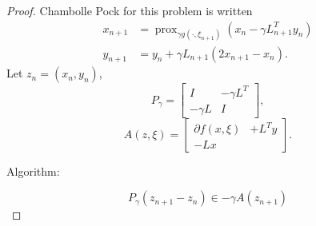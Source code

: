 \documentclass{article}
\DeclareMathOperator{\prox}{prox}
\newcommand{\1}{\mathbbm 1}
\theoremstyle{definition}
\begin{document}
\begin{proof}
Chambolle Pock for this problem is written
\begin{align}
    x_{n+1} &= \prox_{\gamma g(\cdot,\xi_{n+1})}(x_n - \gamma L_{n+1}^T y_n)\\
    y_{n+1} &= y_n + \gamma L_{n+1}(2 x_{n+1} - x_n).
\end{align}
Let $z_n = (x_n, y_n)$, 
\[
P_\gamma = \begin{bmatrix} I &  -\gamma L^T \\ -\gamma L & I \end{bmatrix},
\]
\[
A(z,\xi) = \begin{bmatrix} \partial f(x,\xi)&  + L^T y \\ -L x& \end{bmatrix} .
\]

Algorithm:

$$
P_\gamma(z_{n+1} - z_n) \in -\gamma A(z_{n+1}) 
$$



\end{proof}
\end{document}
